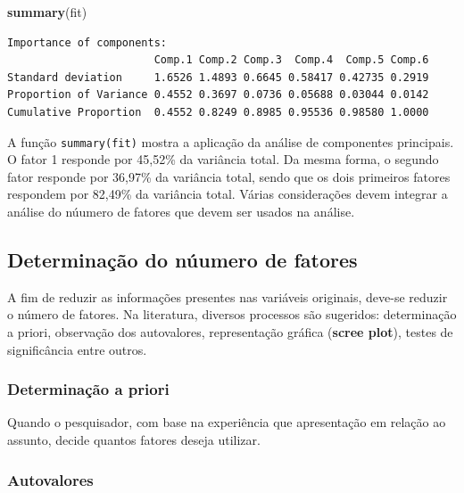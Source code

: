 \documentclass[12pt,brazil,oneside]{book}
\newenvironment{Shaded}{\begin{snugshade}}{\end{snugshade}}
\newcommand{\KeywordTok}[1]{\textcolor[rgb]{0.13,0.29,0.53}{\textbf{#1}}}
\newcommand{\NormalTok}[1]{#1}
\begin{document}
\begin{Shaded}
\begin{Highlighting}[]
\KeywordTok{summary}\NormalTok{(fit)}
\end{Highlighting}
\end{Shaded}

\begin{verbatim}
Importance of components:
                       Comp.1 Comp.2 Comp.3  Comp.4  Comp.5 Comp.6
Standard deviation     1.6526 1.4893 0.6645 0.58417 0.42735 0.2919
Proportion of Variance 0.4552 0.3697 0.0736 0.05688 0.03044 0.0142
Cumulative Proportion  0.4552 0.8249 0.8985 0.95536 0.98580 1.0000
\end{verbatim}

A função \texttt{summary(fit)} mostra a aplicação da análise de componentes principais. O fator 1
responde por 45,52\% da variância total. Da mesma forma, o segundo fator responde por 36,97\% da
variância total, sendo que os dois primeiros fatores respondem por 82,49\% da variância total. Várias
considerações devem integrar a análise do núumero de fatores que devem ser usados na análise.

\hypertarget{determinacao-do-nuumero-de-fatores}{%
\subsection{Determinação do núumero de fatores}\label{determinacao-do-nuumero-de-fatores}}

A fim de reduzir as informações presentes nas variáveis originais, deve-se reduzir o número de fatores. Na literatura, diversos processos são sugeridos: determinação a priori, observação dos autovalores, representação gráfica (\textbf{scree plot}), testes de significância entre outros.

\hypertarget{determinacao-a-priori}{%
\subsubsection{Determinação a priori}\label{determinacao-a-priori}}

Quando o pesquisador, com base na experiência que apresentação em relação ao assunto,
decide quantos fatores deseja utilizar.

\hypertarget{autovalores}{%
\subsubsection{Autovalores}\label{autovalores}}
\end{document}
